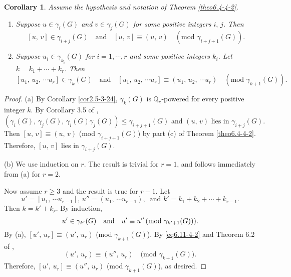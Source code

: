 \documentclass[mathscr]{amsart}
\theoremstyle{theorem}
\newtheorem{corollary}[theorem]{Corollary}
\theoremstyle{definition}
\numberwithin{equation}{section}
\newcommand{\smod}[1]{\hspace*{-.1cm}\pmod{#1}}
\def \({\left(}
\def \){\right)}
\def\Q{\mathbb{Q}}
\begin{document}
\begin{corollary}\label{cor6.5-4-2}
Assume the hypothesis and notation of Theorem \ref{theo6.4-4-2}.
\begin{enumerate}
\item[(a)] Suppose $u\in\gamma_i(G)$ and $v\in\gamma_j(G)$ for some
positive integers $i,\,j$. Then
$$[u,\,v]\in\gamma_{i+j}(G)\quad\text{and}\quad[u,\,v]\equiv(u,\,v)\quad(\text{mod $\gamma_{i+j+1}(G)$}).$$
\item[(b)] Suppose $u_i\in\gamma_{k_i}(G)$ for $i=1,\cdots,r$ and
some positive integers $k_i$. Let $k=k_1+\cdots+k_r$. Then
$$[u_1,\,u_2,\,\cdots u_r]\in\gamma_k(G)\quad\text{and}\quad[u_1,\,u_2,\,\cdots u_r]\equiv(u_1,\,u_2,\,\cdots u_r)
\quad(\text{mod $\gamma_{k+1}(G)$}).$$
\end{enumerate}
\end{corollary}

\begin{proof}
(a) By Corollary \ref{cor2.5-3-24}, $\gamma_k(G)$ is
$\Q_\pi$-powered for every positive integer $k$. By Corollary 3.5 of
\cite{Kh},
$$\(\gamma_i(G),\,\gamma_j(G),\,\gamma_i(G)\gamma_j(G)\)\leq\gamma_{i+j+1}(G)
\text{ and }(u,\,v)\text{ lies in }\gamma_{i+j}(G).$$ Then
$[u,\,v]\equiv(u,\,v)$ (mod $\gamma_{i+j+1}(G)$) by part (c) of
Theorem \ref{theo6.4-4-2}. Therefore, $[u,\,v]$ lies in
$\gamma_{i+j}(G).$

(b) We use induction on $r$. The result is trivial for $r=1$, and
follows immediately from (a) for $r=2$.

Now assume $r\geq3$ and the result is true for  $r-1$. Let
$$u'=[u_1,\,\cdots u_{r-1}],\,u''=(u_1,\,\cdots u_{r-1}),\,\text{ and }
k'=k_1+k_2+\cdots+k_{r-1}.$$ Then $k=k'+k_r$. By induction,
\begin{equation}\label{eq6.11-4-2}
u'\in\gamma_{k'}(G)\quad\text{and}\quad u'\equiv u''\smod
{\gamma_{k'+1}(G)}).
\end{equation}
By (a), $[u',\,u_r]\equiv(u',\,u_r)$ (mod $\gamma_{k+1}(G)$). By
\eqref{eq6.11-4-2} and Theorem 6.2 of \cite{Kh},
$$(u',\,u_r)\equiv(u'',\,u_r)\quad\text{(mod $\gamma_{k+1}(G)$}).$$
Therefore, $[u',\,u_r]\equiv(u'',\,u_r)$ (mod $\gamma_{k+1}(G)$), as
desired.
\end{proof}
\end{document}
